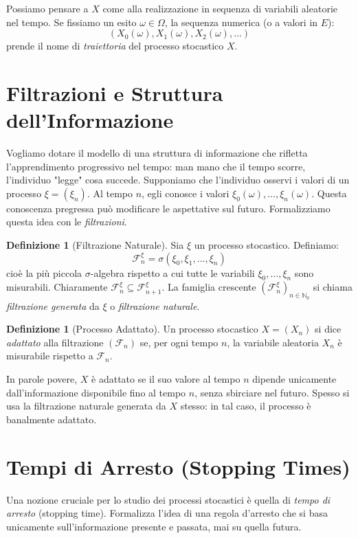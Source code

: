 \documentclass[11pt, a4paper]{report}
\theoremstyle{plain}
\theoremstyle{definition}
\newtheorem{definition}[theorem]{Definizione}
\theoremstyle{remark}
\newcommand{\F}{\mathcal{F}}
\newcommand{\N}{\mathbb{N}}
\newcommand{\1}{\mathbf{1}}
\begin{document}
Possiamo pensare a $X$ come alla realizzazione in sequenza di variabili aleatorie nel tempo. Se fissiamo un esito $\omega \in \Omega$, la sequenza numerica (o a valori in $E$):
\[ (X_0(\omega), X_1(\omega), X_2(\omega), \dots) \]
prende il nome di \emph{traiettoria} del processo stocastico $X$.

\section{Filtrazioni e Struttura dell'Informazione}

Vogliamo dotare il modello di una struttura di informazione che rifletta l'apprendimento progressivo nel tempo: man mano che il tempo scorre, l'individuo "legge" cosa succede.
Supponiamo che l'individuo osservi i valori di un processo $\xi = (\xi_n)$. Al tempo $n$, egli conosce i valori $\xi_0(\omega), \dots, \xi_n(\omega)$. Questa conoscenza pregressa può modificare le aspettative sul futuro.
Formalizziamo questa idea con le \emph{filtrazioni}.

\begin{definition}[Filtrazione Naturale]
Sia $\xi$ un processo stocastico. Definiamo:
\[ \F_n^\xi = \sigma(\xi_0, \xi_1, \dots, \xi_n) \]
cioè la più piccola $\sigma$-algebra rispetto a cui tutte le variabili $\xi_0, \dots, \xi_n$ sono misurabili.
Chiaramente $\F_n^\xi \subseteq \F_{n+1}^\xi$. La famiglia crescente $(\F_n^\xi)_{n \in \N_0}$ si chiama \emph{filtrazione generata} da $\xi$ o \emph{filtrazione naturale}.
\end{definition}

\begin{definition}[Processo Adattato]
Un processo stocastico $X = (X_n)$ si dice \emph{adattato} alla filtrazione $(\F_n)$ se, per ogni tempo $n$, la variabile aleatoria $X_n$ è misurabile rispetto a $\F_n$.
\end{definition}

In parole povere, $X$ è adattato se il suo valore al tempo $n$ dipende unicamente dall'informazione disponibile fino al tempo $n$, senza sbirciare nel futuro. 
Spesso si usa la filtrazione naturale generata da $X$ stesso: in tal caso, il processo è banalmente adattato.

\section{Tempi di Arresto (Stopping Times)}

Una nozione cruciale per lo studio dei processi stocastici è quella di \emph{tempo di arresto} (stopping time). Formalizza l'idea di una regola d'arresto che si basa unicamente sull'informazione presente e passata, mai su quella futura.
\end{document}
